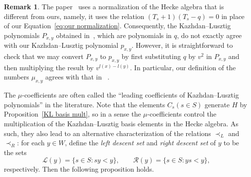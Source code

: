 \documentclass[10pt]{article}
\theoremstyle{definition}
\newtheorem{rema}[theorem]{Remark}
\begin{document}
\begin{rema}
 \label{conversion}
 The paper~\cite{KL} uses a normalization of the Hecke algebra that is
 different from ours, namely, it uses the relation $(T_s+1)(T_s-q)=0$ in place
 of our Equation~\eqref{eq:our normalization}. Consequently, the
 Kazhdan--Lusztig polynomials $P_{x,y}$ obtained in~\cite{KL}, which are
 polynomials in $q$, do not exactly
 agree with our Kazhdan--Lusztig polynomial $p_{x,y}$. However, it is
 straightforward to 
 check that we may convert $P_{x,y}$ to $p_{x,y}$ by first substituting
 $q$ by $v^2$ in $P_{x,y}$ and then multiplying the result by $v^{l(x)-l(y)}$. 
 In particular, our definition of the numbers $\mu_{x,y}$ agrees with that in
~\cite{KL}.
\end{rema}

\noindent The $\mu$-coefficients are often called the ``leading coefficients
of Kazhdan--Lusztig polynomials'' in the literature. Note that the elements $C_s (s\in S)$ generate $H$ by Proposition~\ref{KL basis mult}, so in a sense the $\mu$-coefficients control the
multiplication of the Kazhdan--Lusztig basis elements in the Hecke algebra. As
such, they also lead to an alternative characterization of the relations
$\prec_L$ and $\prec_R$: for each $y\in W$, define the \emph{left descent set} and
\emph{right descent set} of $y$ to be the sets
\[
 \mathcal{L}(y)=\{s\in S:sy<y\},\qquad \mathcal{R}(y)=\{s\in S:ys<y\},
\]
respectively. Then the following proposition holds.
\end{document}
